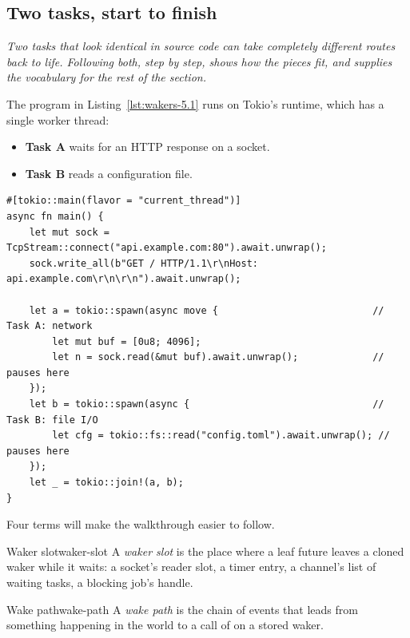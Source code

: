 
\subsection{Two tasks, start to finish}
\label{sec:wakers-ch5}

\textit{Two tasks that look identical in source code can take completely different routes back to life. Following both, step by step, shows how the pieces fit, and supplies the vocabulary for the rest of the section.}

The program in Listing~\ref{lst:wakers-5.1} runs on Tokio's  runtime, which has a single worker thread:

\begin{itemize}
    \item \textbf{Task A} waits for an HTTP response on a socket.
    \item \textbf{Task B} reads a configuration file.
\end{itemize}

\begin{lstlisting}[caption={One network wait and one file read.}, label=lst:wakers-5.1]
#[tokio::main(flavor = "current_thread")]
async fn main() {
    let mut sock = TcpStream::connect("api.example.com:80").await.unwrap();
    sock.write_all(b"GET / HTTP/1.1\r\nHost: api.example.com\r\n\r\n").await.unwrap();

    let a = tokio::spawn(async move {                           // Task A: network
        let mut buf = [0u8; 4096];
        let n = sock.read(&mut buf).await.unwrap();             // pauses here
    });
    let b = tokio::spawn(async {                                // Task B: file I/O
        let cfg = tokio::fs::read("config.toml").await.unwrap(); // pauses here
    });
    let _ = tokio::join!(a, b);
}
\end{lstlisting}

Four terms will make the walkthrough easier to follow.

\begin{definition}{Waker slot}{waker-slot}
    A \emph{waker slot} is the place where a leaf future leaves a cloned waker while it waits: a socket's reader slot, a timer entry, a channel's list of waiting tasks, a blocking job's handle.
\end{definition}

\begin{definition}{Wake path}{wake-path}
    A \emph{wake path} is the chain of events that leads from something happening in the world to a call of  on a stored waker.
\end{definition}

